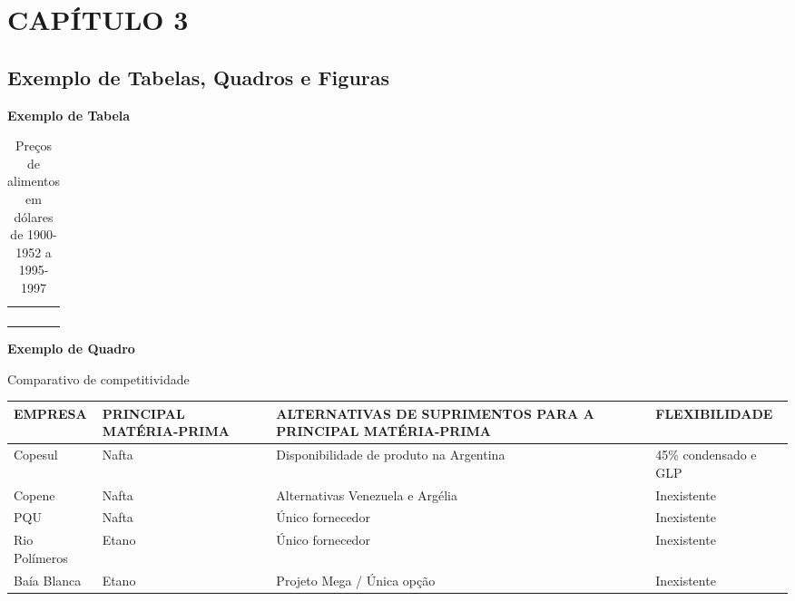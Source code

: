 \chapter{CAPÍTULO 3}
\section{Exemplo de Tabelas, Quadros e Figuras}

 {\centering\bfseries\color{red}
  Exemplo de Tabela
  \par}

\begin{table}[ht]
	\centering
	\caption{Preços de alimentos em dólares de 1900-1952 a
		1995-1997}
	\begin{supertabular}{m{3.6cm}m{3.7cm}m{3.6cm}m{3.0cm}}
		\hline
		 &
		 &
		 &
		\centering{}\\\hline
		 &
		 &
		 &
		\centering{}\\
		 &
		 &
		 &
		\centering{}\\
		 &
		 &
		 &
		\centering{}\\
		 &
		 &
		 &
		\centering{}\\\hline
	\end{supertabular}
	\label{tab:alimentos}
\end{table}

\bigskip

{\centering\bfseries\color{red}
	Exemplo de Quadro
	\par}

\begin{quadro}[htb]
	\centering
	\caption{Comparativo de competitividade}
	\begin{supertabular}{|m{2.5cm}|m{2.5cm}|m{6.0cm}|m{3.0cm}|}
		\hline
		{ EMPRESA } &
		{ PRINCIPAL MATÉRIA-PRIMA } &
		{ ALTERNATIVAS DE SUPRIMENTOS PARA A PRINCIPAL MATÉRIA-PRIMA } &
		{ FLEXIBILIDADE }\\\hline
		{ Copesul } &
		{ Nafta } &
		{ Disponibilidade de produto na Argentina} &
		{ 45\% condensado e GLP }\\\hline
		{ Copene } &
		{ Nafta } &
		{ Alternativas Venezuela e Argélia } &
		{ Inexistente }\\\hline
		{ PQU } &
		{ Nafta } &
		{ Único fornecedor } &
		{ Inexistente }\\\hline
		{ Rio Polímeros } &
		{ Etano } &
		{ Único fornecedor } &
		{ Inexistente }\\\hline
		{ Baía Blanca } &
		{ Etano } &
		{ Projeto Mega / Única opção } &
		{ Inexistente }\\\hline
	\end{supertabular}
	\label{quad:quadro1}
\end{quadro}

